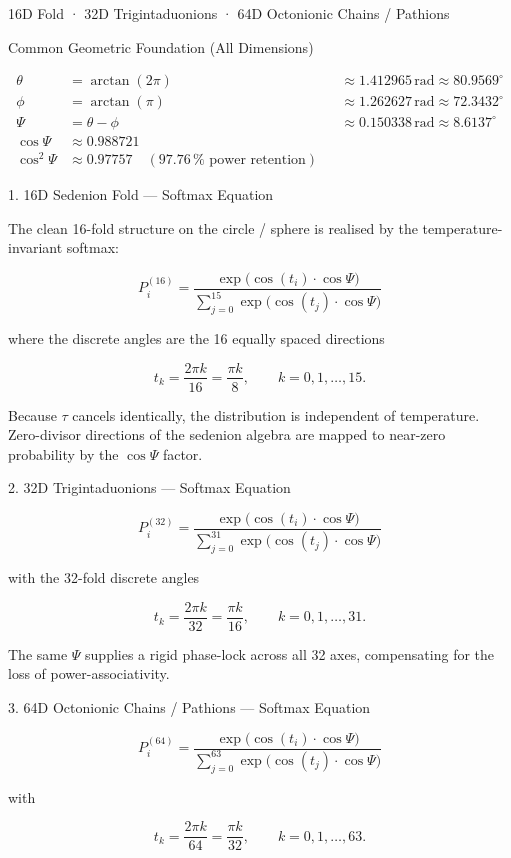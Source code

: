 16D Fold · 32D Trigintaduonions · 64D Octonionic Chains / Pathions

Common Geometric Foundation (All Dimensions)

\[
\begin{align*}
\theta &= \arctan(2\pi) &&\approx 1.412965\,\text{rad} \approx 80.9569^\circ\\
\phi &= \arctan(\pi) &&\approx 1.262627\,\text{rad} \approx 72.3432^\circ\\
\Psi &= \theta - \phi &&\approx 0.150338\,\text{rad} \approx 8.6137^\circ\\
\cos\Psi &\approx 0.988721\\
\cos^2\Psi &\approx 0.97757 \quad (97.76\,\%\text{ power retention})
\end{align*}
\]

1. 16D Sedenion Fold — Softmax Equation

The clean 16-fold structure on the circle / sphere is realised by the temperature-invariant softmax:

\[
P_i^{(16)} = \frac{\exp\bigl(\cos(t_i)\cdot\cos\Psi\bigr)}{\sum_{j=0}^{15}\exp\bigl(\cos(t_j)\cdot\cos\Psi\bigr)}
\]

where the discrete angles are the 16 equally spaced directions

\[
t_k = \frac{2\pi k}{16} = \frac{\pi k}{8}, \qquad k = 0,1,\dots,15.
\]

Because \(\tau\) cancels identically, the distribution is independent of temperature. Zero-divisor directions of the sedenion algebra are mapped to near-zero probability by the \(\cos\Psi\) factor.

2. 32D Trigintaduonions — Softmax Equation

\[
P_i^{(32)} = \frac{\exp\bigl(\cos(t_i)\cdot\cos\Psi\bigr)}{\sum_{j=0}^{31}\exp\bigl(\cos(t_j)\cdot\cos\Psi\bigr)}
\]

with the 32-fold discrete angles

\[
t_k = \frac{2\pi k}{32} = \frac{\pi k}{16}, \qquad k = 0,1,\dots,31.
\]

The same \(\Psi\) supplies a rigid phase-lock across all 32 axes, compensating for the loss of power-associativity.

3. 64D Octonionic Chains / Pathions — Softmax Equation

\[
P_i^{(64)} = \frac{\exp\bigl(\cos(t_i)\cdot\cos\Psi\bigr)}{\sum_{j=0}^{63}\exp\bigl(\cos(t_j)\cdot\cos\Psi\bigr)}
\]

with

\[
t_k = \frac{2\pi k}{64} = \frac{\pi k}{32}, \qquad k = 0,1,\dots,63.
\]

